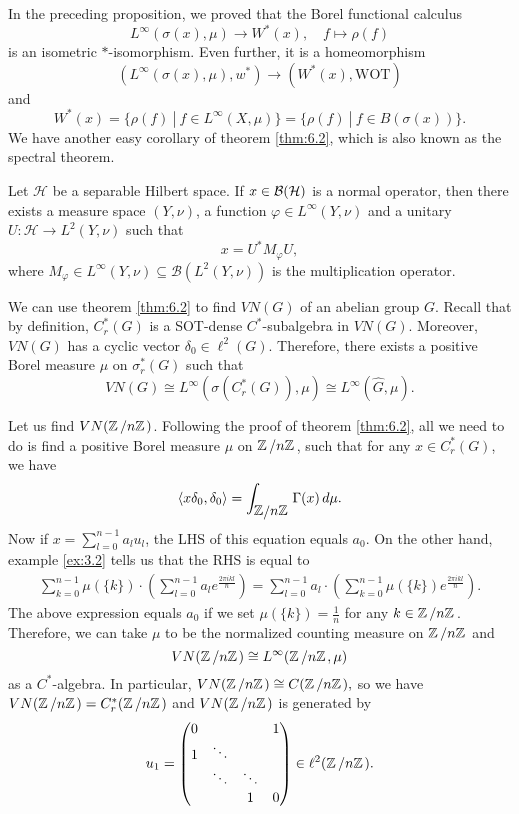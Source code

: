 In the preceding proposition, we proved that the Borel functional calculus
$$L^\infty(\sigma(x), \mu) \to W^* (x),\quad f \mapsto \rho (f)$$
is an isometric $*$-isomorphism. Even further, it is a homeomorphism 
$$(L^\infty (\sigma(x), \mu), w^*) \to (W^* (x), \textrm{WOT})$$
and $$W^* (x) = \{\rho (f)\ |\ f \in L^\infty (X, \mu)\} = \{\rho (f)\ |\ f \in B(\sigma(x))\}.$$
We have another easy corollary of theorem \ref{thm:6.2}, which is also known as the spectral theorem.

\begin{theorem}
  Let $\mathcal{H}$ be a separable Hilbert space.
  If $x \in \operatorname{\mathcal{B} (\mathcal{H})}$ is a normal operator, then there exists a measure space $(Y, \nu)$, a function $\varphi \in L^\infty (Y, \nu)$
  and a unitary $U: \mathcal{H} \to L^2(Y, \nu)$ such that 
  $$x = U^* M_{\varphi} U,$$
  where $M_{\varphi} \in L^\infty (Y, \nu) \subseteq \mathcal{B}(L^2 (Y, \nu))$
  is the multiplication operator.
\end{theorem}

We can use theorem \ref{thm:6.2} to find $VN(G)$ of an abelian group $G$.
Recall that by definition, $C_r ^* (G)$ is a SOT-dense $C^*$-subalgebra in $VN(G)$.
Moreover, $VN(G)$ has a cyclic vector $\delta_0 \in \ell^2 (G)$.
Therefore, there exists a positive Borel measure $\mu$ on $\sigma_r ^* (G)$ such that $$VN(G) \cong L^\infty (\sigma (C_r ^* (G)), \mu) \cong L^\infty (\widehat{G}, \mu).$$

\begin{example}
  Let us find $VN(\quot{\Z}{n\Z})$.
  Following the proof of theorem \ref{thm:6.2}, all we need to do is find a positive Borel measure $\mu$ on $\quot{\Z}{n\Z}$, such that for any $x \in C_r ^* (G)$, we have
  $$\langle x \delta_0, \delta_0 \rangle = \int_{\quot{\mathbb{Z}}{n\mathbb{Z}}} \Gamma (x)\, d\mu.$$
  Now if $x = \sum_{l = 0} ^{n - 1} a_l u_l$, the LHS of this equation equals $a_0$.
  On the other hand, example \ref{ex:3.2} tells us that the RHS is equal to 
  \begin{align*}
    \sum_{k = 0} ^{n - 1} \mu (\{k\}) \cdot \left(\sum_{l = 0} ^{n - 1} a_l e^{\frac{2 \pi i k l}{n}}\right) = \sum_{l = 0} ^{n - 1} a_l \cdot \left(\sum_{k = 0} ^{n - 1} \mu (\{k\})  e^{\frac{2 \pi i k l}{n}}\right).
  \end{align*}
  The above expression equals $a_0$ if we set $\mu (\{k\}) = \frac{1}{n}$ for any $k \in \quot{\Z}{n\Z}$.
  Therefore, we can take $\mu$ to be the normalized counting measure on $\quot{\Z}{n\Z}$ and 
  $$VN(\quot{\Z}{n\Z}) \cong L^\infty (\quot{\Z}{n\Z}, \mu)$$
  as a $C^*$-algebra. In particular, $VN(\quot{\Z}{n\Z}) \cong C(\quot{\Z}{n\Z}),$
  so we have $VN(\quot{\Z}{n\Z}) = C_r ^* (\quot{\Z}{n\Z})$ and $VN(\quot{\Z}{n\Z})$ is generated by 
  $$u_1 = \begin{pmatrix}
    0 &  & & 1\\
    1 & \ddots && \\
      & \ddots & \ddots & \\
     & & 1 & 0
  \end{pmatrix} \in \ell^2 (\quot{\Z}{n\Z}).$$
\end{example}

